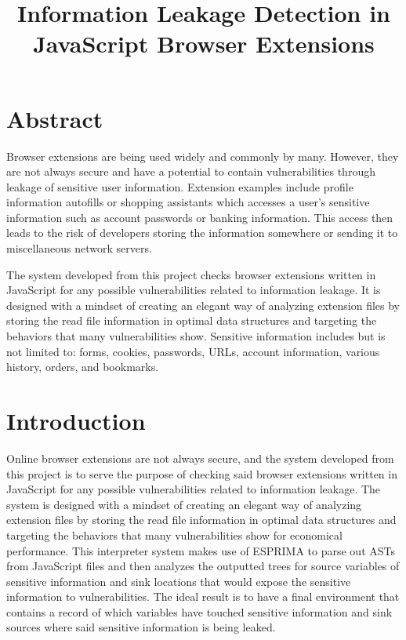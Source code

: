\documentclass[jou,apacite]{apa6}
\title{Information Leakage Detection in JavaScript Browser Extensions}
\begin{document}
\maketitle    
                        
\section{Abstract}

Browser extensions are being used widely and commonly by many. However, they are not always secure and have a potential to contain vulnerabilities through leakage of sensitive user information. Extension examples include profile information autofills or shopping assistants which accesses a user's sensitive information such as account passwords or banking information. This access then leads to the risk of developers storing the information somewhere or sending it to miscellaneous network servers.

The system developed from this project checks browser extensions written in JavaScript for any possible vulnerabilities related to information leakage. It is designed with a mindset of creating an elegant way of analyzing extension files by storing the read file information in optimal data structures and targeting the behaviors that many vulnerabilities show. Sensitive information includes but is not limited to: forms, cookies, passwords, URLs, account information, various history, orders, and bookmarks.

\section{Introduction}

Online browser extensions are not always secure, and the system developed from this project is to serve the purpose of checking said browser extensions written in JavaScript for any possible vulnerabilities related to information leakage. The system is designed with a mindset of creating an elegant way of analyzing extension files by storing the read file information in optimal data structures and targeting the behaviors that many vulnerabilities show for economical performance. This interpreter system makes use of ESPRIMA to parse out ASTs from JavaScript files and then analyzes the outputted trees for source variables of sensitive information and sink locations that would expose the sensitive information to vulnerabilities. The ideal result is to have a final environment that contains a record of which variables have touched sensitive information and sink sources where said sensitive information is being leaked.
\end{document}
